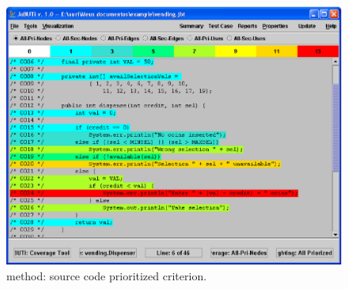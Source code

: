 \begin{figure}[!ht]
\begin{center}
\includegraphics[height=0.40\textheight]{fig/dispenser-source.eps}
\caption{\label{fig:dispenser-source} 
method: source code prioritized \wrt {}
criterion.}
\end{center}
\end{figure}
